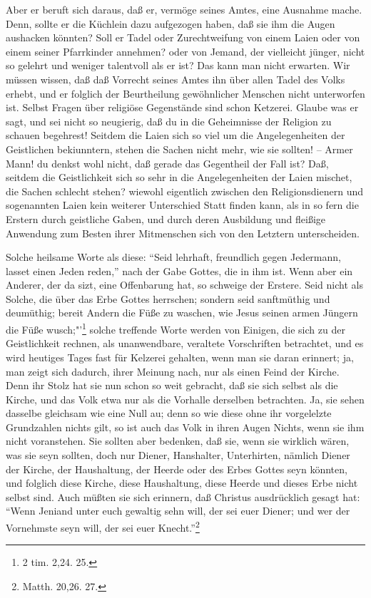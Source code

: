 Aber er beruft sich daraus, daß er, vermöge seines Amtes, eine Ausnahme mache. Denn, sollte er die Küchlein dazu aufgezogen haben, daß sie ihm die Augen aushacken könnten? Soll er Tadel oder Zurechtweifung von einem Laien oder von einem seiner Pfarrkinder annehmen? oder von Jemand, der vielleicht jünger, nicht so gelehrt und weniger talentvoll als er ist? Das kann man nicht erwarten. Wir müssen wissen, daß daß Vorrecht seines Amtes ihn über allen Tadel des Volks erhebt, und er folglich der Beurtheilung gewöhnlicher Menschen nicht unterworfen ist. Selbst Fragen über religiöse Gegenstände sind schon Ketzerei. Glaube was er sagt, und sei nicht so neugierig, daß du in die Geheimnisse der Religion zu schauen begehrest! Seitdem die Laien sich so viel um die Angelegenheiten der Geistlichen bekiunntern, stehen die Sachen nicht mehr, wie sie sollten! -- Armer Mann! du denkst wohl nicht, daß gerade das Gegentheil der Fall ist? Daß, seitdem die Geistlichkeit sich so sehr in die Angelegenheiten der Laien mischet, die Sachen schlecht stehen? wiewohl eigentlich zwischen den Religionsdienern und sogenannten Laien kein weiterer Unterschied Statt finden kann, als in so fern die Erstern durch geistliche Gaben, und durch deren Ausbildung und fleißige Anwendung zum Besten ihrer Mitmenschen sich von den Letztern unterscheiden.

Solche heilsame Worte als diese: "`Seid lehrhaft, freundlich gegen Jedermann, lasset einen Jeden reden,"' nach der Gabe Gottes, die in ihm ist. Wenn aber ein Anderer, der da sizt, eine Offenbarung hat, so schweige der Erstere. Seid nicht als Solche, die über das Erbe Gottes herrschen; sondern seid sanftmüthig und deumüthig; bereit Andern die Füße zu waschen, wie Jesus seinen armen Jüngern die Füße wusch;"'\footnote{2 tim. 2,24. 25.} solche treffende Worte werden von Einigen, die sich zu der Geistlichkeit rechnen, als unanwendbare, veraltete Vorschriften betrachtet, und es wird heutiges Tages fast für Kelzerei gehalten, wenn man sie daran erinnert; ja, man zeigt sich dadurch, ihrer Meinung nach, nur als einen Feind der Kirche. Denn ihr Stolz hat sie nun schon so weit gebracht, daß sie sich selbst als die Kirche, und das Volk etwa nur als die Vorhalle derselben betrachten. Ja, sie sehen dasselbe gleichsam wie eine Null au; denn so wie diese ohne ihr vorgelelzte Grundzahlen nichts gilt, so ist auch das Volk in ihren Augen Nichts, wenn sie ihm nicht voranstehen. Sie sollten aber bedenken, daß sie, wenn sie wirklich wären, was sie seyn sollten, doch nur Diener, Hanshalter, Unterhirten, nämlich Diener der Kirche, der Haushaltung, der Heerde oder des Erbes Gottes seyn könnten, und folglich diese Kirche, diese Haushaltung, diese Heerde und dieses Erbe nicht selbst sind. Auch müßten sie sich erinnern, daß Christus ausdrücklich gesagt hat: "`Wenn Jeniand unter euch gewaltig sehn will, der sei euer Diener; und wer der Vornehmste seyn will, der sei euer Knecht."'\footnote{Matth. 20,26. 27.}

